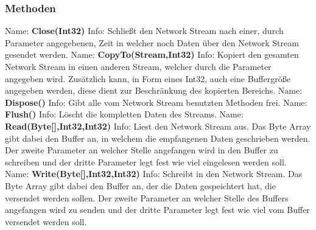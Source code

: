 \subsubsection{Methoden}
Name: \textbf{Close(Int32)}
\newline
Info: Schließt den Network Stream nach einer, durch Parameter angegebenen, Zeit in welcher noch Daten über den Network Stream gesendet werden.
\newline \newline
Name: \textbf{CopyTo(Stream,Int32)}
\newline
Info: Kopiert den gesamten Network Stream in einen anderen Stream, welcher durch die Parameter angegeben wird. Zusätzlich kann, in Form eines Int32, auch eine Buffergröße angegeben werden, diese dient zur Beschränkung des kopierten Bereichs.
\newline \newline
Name: \textbf{Dispose()}
\newline
Info: Gibt alle vom Network Stream benutzten Methoden frei.
\newline \newline
Name: \textbf{Flush()}
\newline
Info: Löscht die kompletten Daten des Streams.
\newline \newline
Name: \textbf{Read(Byte[],Int32,Int32)}
\newline
Info: Liest den Network Stream aus. Das Byte Array gibt dabei den Buffer an, in welchem die empfangenen Daten geschrieben werden. Der zweite Parameter an welcher Stelle angefangen wird in den Buffer zu schreiben und der dritte Parameter legt fest wie viel eingelesen werden soll.
\newline \newline
Name: \textbf{Write(Byte[],Int32,Int32)}
\newline
Info: Schreibt in den Network Stream. Das Byte Array gibt dabei den Buffer an, der die Daten gespeichtert hat, die versendet werden sollen. Der zweite Parameter an welcher Stelle des Buffers angefangen wird zu senden und der dritte Parameter legt fest wie viel vom Buffer versendet werden soll.
\newline \newline